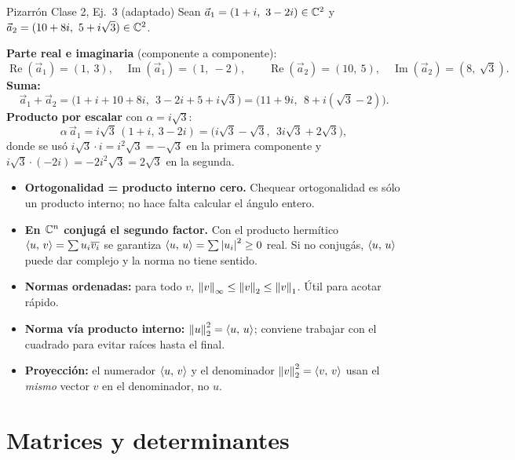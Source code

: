 \begin{ejemplo}{Pizarrón Clase 2, Ej.\ 3 (adaptado)}
Sean $\vec a_1 = (1+i,\ 3-2i) \in \mathbb{C}^2$ y $\vec a_2 = (10+8i,\ 5+i\sqrt3) \in \mathbb{C}^2$.

\smallskip
\textbf{Parte real e imaginaria} (componente a componente):
\[
\operatorname{Re}(\vec a_1) = (1,\ 3), \quad \operatorname{Im}(\vec a_1) = (1,\ -2), \qquad
\operatorname{Re}(\vec a_2) = (10,\ 5), \quad \operatorname{Im}(\vec a_2) = (8,\ \sqrt3).
\]
\textbf{Suma:}
\[
\vec a_1 + \vec a_2 = \big(1+i+10+8i,\ \ 3-2i+5+i\sqrt3\big) = \big(11+9i,\ \ 8 + i(\sqrt3 - 2)\big).
\]
\textbf{Producto por escalar} con $\alpha = i\sqrt3$:
\[
\alpha\,\vec a_1 = i\sqrt3\,(1+i,\ 3-2i) = \big(i\sqrt3 - \sqrt3,\ \ 3i\sqrt3 + 2\sqrt3\big),
\]
donde se usó $i\sqrt3\cdot i = i^2\sqrt3 = -\sqrt3$ en la primera componente y $i\sqrt3\cdot(-2i) = -2i^2\sqrt3 = 2\sqrt3$ en la segunda.
\end{ejemplo}

\begin{truco}
\begin{itemize}
  \item \textbf{Ortogonalidad = producto interno cero.} Chequear ortogonalidad es sólo un producto interno; no hace falta calcular el ángulo entero.
  \item \textbf{En $\mathbb{C}^n$ conjugá el segundo factor.} Con el producto hermítico $\left\langle u,\, v \right\rangle = \sum u_i \overline{v_i}$ se garantiza $\left\langle u,\, u \right\rangle = \sum \left\lvert u_i \right\rvert^2 \ge 0$ real. Si no conjugás, $\left\langle u,\, u \right\rangle$ puede dar complejo y la norma no tiene sentido.
  \item \textbf{Normas ordenadas:} para todo $v$, $\left\lVert v \right\rVert_\infty \le \left\lVert v \right\rVert_2 \le \left\lVert v \right\rVert_1$. Útil para acotar rápido.
  \item \textbf{Norma vía producto interno:} $\left\lVert u \right\rVert_2^2 = \left\langle u,\, u \right\rangle$; conviene trabajar con el cuadrado para evitar raíces hasta el final.
  \item \textbf{Proyección:} el numerador $\left\langle u,\, v \right\rangle$ y el denominador $\left\lVert v \right\rVert_2^2 = \left\langle v,\, v \right\rangle$ usan el \emph{mismo} vector $v$ en el denominador, no $u$.
\end{itemize}
\end{truco}

\section{Matrices y determinantes}

